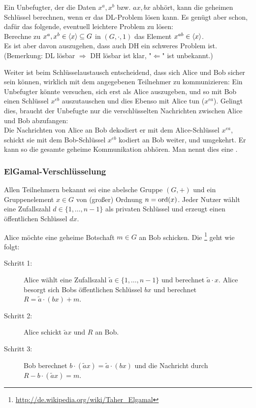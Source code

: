 \begin{bem}
	Ein Unbefugter, der die Daten $x^a, x^b$ bzw. $ax,bx$ abhört, kann die geheimen Schlüssel berechnen, wenn er das DL-Problem lösen kann. Es genügt aber schon, dafür das folgende, eventuell leichtere Problem zu lösen: \\
	Berechne zu $x^a, x^b \in \langle x\rangle \subseteq G$ in $(G,\cdot,1)$ das Element $x^{ab} \in \langle x\rangle$. \\
	Es ist aber davon auszugehen, dass auch DH ein schweres Problem ist. \\
	(Bemerkung: DL lösbar $\Rightarrow$ DH lösbar ist klar, "$\Leftarrow$" ist unbekannt.)
\end{bem}

\begin{bem}
	Weiter ist beim Schlüsselaustausch entscheidend, dass sich Alice und Bob sicher sein können, wirklich mit dem angegebenen Teilnehmer zu kommunizieren: Ein Unbefugter könnte versuchen, sich erst als Alice auszugeben, und so mit Bob einen Schlüssel $x^{eb}$ auszutauschen und dies Ebenso mit Alice tun ($x^{ea}$). Gelingt dies, braucht der Unbefugte nur die verschlüsselten Nachrichten zwischen Alice und Bob abzufangen: \\
	Die Nachrichten von Alice an Bob dekodiert er mit dem Alice-Schlüssel $x^{ea}$, schickt sie mit dem Bob-Schlüssel $x^{eb}$ kodiert an Bob weiter, und umgekehrt. Er kann so die gesamte geheime Kommunikation abhören. Man nennt dies eine .
\end{bem}

\nextlecture
\subsubsection{ElGamal-Verschlüsselung}
\label{subsub:1.2.3}
	Allen Teilnehmern bekannt sei eine abelsche Gruppe $(G,+)$ \marginnote{[6]} und ein Gruppenelement $x \in G$ von (großer) Ordnung $n = \operatorname{ord}(x)$. Jeder Nutzer wählt eine Zufallszahl $d \in \{1, \dots, n-1\}$ als privaten Schlüssel und erzeugt einen öffentlichen Schlüssel $dx$.
	
\begin{anw}
	Alice möchte eine geheime Botschaft $m \in G$ an Bob schicken. Die \footnote{\url{http://de.wikipedia.org/wiki/Taher_Elgamal}} geht wie folgt: 
	\begin{description}
		\item[Schritt 1:] Alice wählt eine Zufallszahl $\tilde{a} \in \{1, \dots, n-1\}$ und berechnet $\tilde{a} \cdot x$. Alice besorgt sich Bobs öffentlichen Schlüssel $bx$ und berechnet $R = \tilde{a} \cdot (bx) + m$.
		\item[Schritt 2:] Alice schickt $\tilde{a}x$ und $R$ an Bob.
		\item[Schritt 3:] Bob berechnet $b \cdot (\tilde{a}x) = \tilde{a} \cdot (bx)$ und die Nachricht durch $R - b\cdot(\tilde{a}x) = m$.
	\end{description}
\end{anw}

